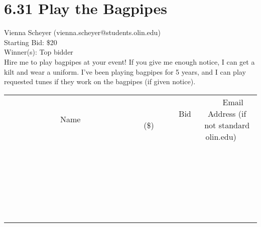 \documentclass[11pt]{article}
\begin{document}
\section*{6.31 Play the Bagpipes}
Vienna Scheyer (vienna.scheyer@students.olin.edu) \\
Starting Bid: \$20 \\
Winner(s): 
Top bidder \\
Hire me to play bagpipes at your event! If you give me enough notice, I can get a kilt and wear a uniform. I've been playing bagpipes for 5 years, and I can play requested tunes if they work on the bagpipes (if given notice). \\[6ex]
\begin{tabular}{c c c}
~~~~~~~~~~~~~Name~~~~~~~~~~~~~ & ~~~~~~~~~Bid (\$)~~~~~~~~~ & ~~~Email Address (if not standard olin.edu)~~~ \\
 & & \\
\hline
 & & \\
\hline
 & & \\
\hline
 & & \\
\hline
 & & \\
\hline
 & & \\
\hline
 & & \\
\hline
 & & \\
\hline
 & & \\
\hline
 & & \\
\hline
 & & \\
\hline
 & & \\
\hline
 & & \\
\hline
 & & \\
\hline
 & & \\
\hline
 & & \\
\hline
 & & \\
\hline
 & & \\
\hline
 & & \\
\hline
 & & \\
\hline
 & & \\
\hline
 & & \\
\hline
 & & \\
\hline
 & & \\
\hline
 & & \\
\hline
 & & \\
\hline
\end{tabular}
\clearpage
\end{document}
